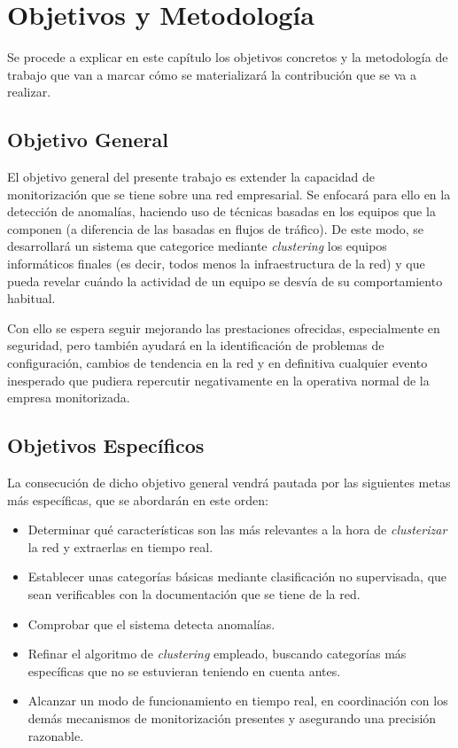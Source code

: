 \chapter{Objetivos y Metodología}\label{chap:objetivos}

Se procede a explicar en este capítulo los objetivos concretos y la metodología de trabajo que van a marcar cómo se materializará la contribución que se va a realizar.

\section{Objetivo General}\label{sec:objgeneral}
El objetivo general del presente trabajo es extender la capacidad de monitorización que se tiene sobre una red empresarial.
Se enfocará para ello en la detección de anomalías, haciendo uso de técnicas basadas en los equipos que la componen (a diferencia de las basadas en flujos de tráfico).
De este modo, se desarrollará un sistema que categorice mediante \emph{clustering} los equipos informáticos finales (es decir, todos menos la infraestructura de la red)
y que pueda revelar cuándo la actividad de un equipo se desvía de su comportamiento habitual.

Con ello se espera seguir mejorando las prestaciones ofrecidas, especialmente en seguridad, pero también ayudará en la identificación de problemas de configuración, cambios de tendencia en la red y en definitiva cualquier evento inesperado que pudiera repercutir negativamente en la operativa normal de la empresa monitorizada.

\section{Objetivos Específicos}\label{sec:objespecificos}
La consecución de dicho objetivo general vendrá pautada por las siguientes metas más específicas, que se abordarán en este orden:

\begin{itemize}

\item Determinar qué características son las más relevantes a la hora de \emph{clusterizar} la red y extraerlas en tiempo real.

\item Establecer unas categorías básicas mediante clasificación no supervisada, que sean verificables con la documentación que se tiene de la red.

\item Comprobar que el sistema detecta anomalías.

\item Refinar el algoritmo de \emph{clustering} empleado, buscando categorías más específicas que no se estuvieran teniendo en cuenta antes.

\item Alcanzar un modo de funcionamiento en tiempo real, en coordinación con los demás mecanismos de monitorización presentes y asegurando una precisión razonable.

\end{itemize}


